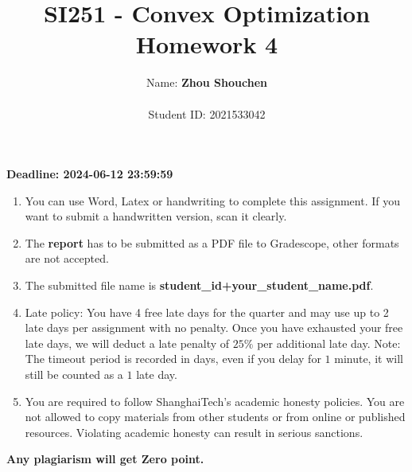 \documentclass{article}
\title{SI251 - Convex Optimization Homework 4}
\author{
    Name: \textbf{Zhou Shouchen} \\\\
    Student ID: 2021533042
}
\begin{document}
\date{}
\maketitle
\centerline{\Large \textbf{Deadline: 2024-06-12 23:59:59}}
\vspace*{30pt}
\begin{enumerate}
    \item You can use Word, Latex or handwriting to complete this assignment. If you want to submit a handwritten version, scan it clearly.
    \item The \textbf{report} has to be submitted as a PDF file to Gradescope, other formats are not accepted.
    \item The submitted file name is \textbf{student\_id+your\_student\_name.pdf}.
    \item Late policy: You have 4 free late days for the quarter and may use up to 2 late days per assignment with no penalty. Once you have exhausted your free late days, we will deduct a late penalty of $25\%$ per additional late day. Note: The timeout period is recorded in days, even if you delay for $1$ minute, it will still be counted as a $1$ late day.
    \item You are required to follow ShanghaiTech’s academic honesty policies. You are not allowed to copy materials from other students or from online or published resources. Violating academic honesty can result in serious sanctions.
\end{enumerate}

\textbf{Any plagiarism will get Zero point.}

\newpage




\end{document}
